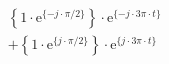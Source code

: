 \correct
\[
\begin{split}
& \left \{ 1 \cdot \textrm{e}^{\{-j \cdot \pi/2 \}} \right \} \cdot \textrm{e}^{\{- j \cdot 3\pi \cdot t \}}\\
&+\left \{ 1 \cdot \textrm{e}^{\{ j \cdot \pi/2 \}} \right \} \cdot \textrm{e}^{\{  j \cdot 3\pi \cdot t \}}
\end{split}
\]
